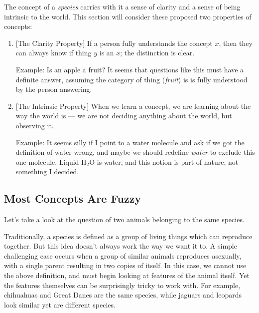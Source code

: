 \documentclass[11pt, oneside]{article}
\begin{document}
The concept of a {\em species} carries with it a sense of clarity and a
sense of being intrinsic to the world.
This section will consider
these proposed two properties of concepts:
\begin{enumerate}
    \item{} [The Clarity Property]
        If a person fully understands the concept $x$,
        then they can always know if thing $y$ is an $x$;
        the distinction is clear.

        Example: Is an apple a fruit? It seems that questions like this must
        have a definite answer, assuming the category of thing ({\em fruit}) is
        is fully understood by the person answering.
    \item{} [The Intrinsic Property]
        When we learn a concept, we are learning about the way the world
        is --- we are not deciding anything about the world, but observing it.

        Example: It seems silly if I point to a water molecule and ask if we got
        the definition of water wrong, and maybe we should redefine {\em water}
        to exclude this one molecule.
        Liquid H$_2$O is water, and this notion is part
        of nature, not something I decided.
\end{enumerate}


\subsection{Most Concepts Are Fuzzy}

Let's take a look at the question of two animals belonging to the
same species.

Traditionally, a species is defined as a group of living things
which can reproduce together. But this idea doesn't always work the way we want
it to. A simple challenging case occurs when a group of similar animals
reproduces asexually, with a single parent resulting in two copies of itself. In
this case, we cannot use the above definition, and must begin looking at
features of the animal itself. Yet the features themselves can be surprisingly
tricky to work with. For example, chihuahuas and Great Danes are the same
species, while jaguars and leopards look similar yet are different species.
\end{document}
